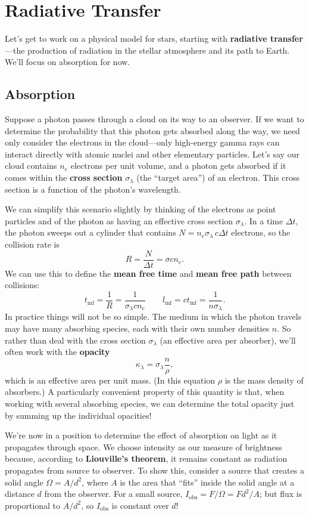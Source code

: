 \documentclass[../a062main.tex]{subfiles}
\begin{document}
\section{Radiative Transfer}
Let's get to work on a physical model for stars, starting with \textbf{radiative transfer}---the production of radiation in the stellar atmosphere and its path to Earth.
We'll focus on absorption for now.

\subsection*{Absorption}
Suppose a photon passes through a cloud on its way to an observer.
If we want to determine the probability that this photon gets absorbed along the way, we need only consider the electrons in the cloud---only high-energy gamma rays can interact directly with atomic nuclei and other elementary particles.
Let's say our cloud contains $n_e$ electrons per unit volume, and a photon gets absorbed if it comes within the \textbf{cross section} $\sigma_\lambda$ (the ``target area'') of an electron.
This cross section is a function of the photon's wavelength.

We can simplify this scenario slightly by thinking of the electrons as point particles and of the photon as having an effective cross section $\sigma_\lambda$.
In a time $\Delta t$, the photon sweeps out a cylinder that contains $N = n_e \sigma_\lambda \,c\Delta t$ electrons, so the collision rate is
\[ R = \frac{N}{\Delta t} = \sigma c n_e. \]
We can use this to define the \textbf{mean free time} and \textbf{mean free path} between collisions:
\[ t_\textrm{mf} = \frac{1}{R} = \frac{1}{\sigma_\lambda c n_e} \qquad l_\textrm{mf} = ct_\textrm{mf} = \frac{1}{n \sigma_\lambda}. \]
In practice things will not be so simple.
The medium in which the photon travels may have many absorbing species, each with their own number densities $n$.
So rather than deal with the cross section $\sigma_\lambda$ (an effective area per absorber), we'll often work with the \textbf{opacity}
\[ \boxed{\kappa_\lambda = \sigma_\lambda \frac{n}{\rho}}, \]
which is an effective area per unit mass.
(In this equation $\rho$ is the mass density of absorbers.)
A particularly convenient property of this quantity is that, when working with several absorbing species, we can determine the total opacity just by summing up the individual opacities!

We're now in a position to determine the effect of absorption on light as it propagates through space.
We choose intensity as our measure of brightness because, according to \textbf{Liouville's theorem}, it remains constant as radiation propagates from source to observer.
To show this, consider a source that creates a solid angle $\Omega = A / d^2$, where $A$ is the area that ``fits'' inside the solid angle at a distance $d$ from the observer.
For a small source, $I_\textrm{obs} = F / \Omega = Fd^2 / A$; but flux is proportional to $A / d^2$, so $I_\textrm{obs}$ is constant over $d$!
\end{document}
